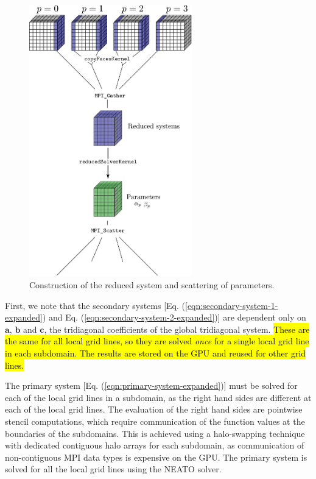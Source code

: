 \documentclass{elsarticle}
\begin{document}
\begin{figure}
\begin{center}
\includegraphics[width=200pt]{img/constructing-reduced-system.eps}
\caption{Construction of the reduced system and scattering of parameters.}
\label{fig:constructing-reduced-system}
\end{center}
\end{figure}

First, we note that
the secondary systems
[Eq. (\ref{eqn:secondary-system-1-expanded}) and
 Eq. (\ref{eqn:secondary-system-2-expanded})]
are dependent only on $\bm{a}$, $\bm{b}$ and $\bm{c}$,
the tridiagonal coefficients of the global tridiagonal system.
\hl{These are the same for all local grid lines,
so they are solved \emph{once} for a single local grid line in each subdomain.
The results are stored on the GPU and reused for other grid lines.}

The primary system [Eq. (\ref{eqn:primary-system-expanded})] must be solved
for each of the local grid lines in a subdomain,
as the right hand sides are different at each of the local grid lines. 
The evaluation of the right hand sides are
pointwise stencil computations,
which require communication of the
function values at the boundaries of the subdomains.
This is achieved using a halo-swapping technique
with dedicated contiguous halo arrays for each subdomain,
as communication of non-contiguous MPI
data types is expensive on the GPU.
The primary system is solved for all the local grid lines
using the NEATO solver.
\end{document}
